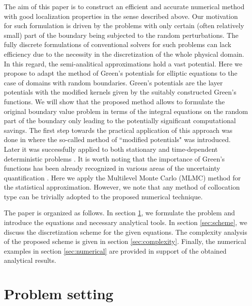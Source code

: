 The aim of this paper is to construct an efficient and accurate numerical method with good localization properties in the sense described above.
Our motivation for such formulation is driven by the problems with only certain (often relatively small) part of the boundary being subjected to the random perturbations.
The fully discrete formulations of conventional solvers for such problems can lack efficiency due to the necessity in the discretization of the whole physical domain.
In this regard, the semi-analitical approximations hold a vast potential. 
Here we propose to adapt the method of Green's potentials for elliptic equations to the case of domains with random boundaries.
Green's potentials are the layer potentials with the modified kernels given by the suitably constructed Green's functions.
We will show that the proposed method allows to formulate the original boundary value problem in terms of the integral equations on the random part of the boundary only leading to the potentially significant computational savings.
The first step towards the practical application of this approach was done in \cite{Melnikov1977} where the so-called method of ``modified potentials" was introduced.
Later it was successfully applied to both stationary and time-dependent deterministic problems \cite{Melnikov2014,Melnikov1996}.
It is worth noting that the importance of Green's functions has been already recognized in various areas of the uncertainty quantification  \cite{Collins2015,BarajasSolano2013,Neuman1993,Neuman1996,Manolis1996}. 
Here we apply the Multilevel Monte Carlo (MLMC) method \cite{Giles2008} for the statistical approximation.
However, we note that any method of collocation type can be trivially adopted to the proposed numerical technique.


The paper is organized as follows.
In section \ref{sec:formulation}, we formulate the problem and introduce the equations and necessary analytical tools. %
In section \ref{sec:scheme}, we discuss the discretization scheme for the given equations.
The complexity analysis of the proposed scheme is given in section \ref{sec:complexity}.
Finally, the numerical examples in section \ref{sec:numerical} are provided in support of the obtained analytical results.



\section{Problem setting}
\label{sec:formulation}

